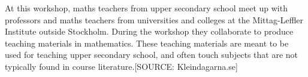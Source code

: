 At this workshop, maths teachers from upper secondary school meet up with professors and maths teachers from universities and colleges at the Mittag-Leffler Institute outside Stockholm. During the workshop they collaborate to produce teaching materials in mathematics. These teaching materials are meant to be used for teaching upper secondary school, and often touch subjects that are not typically found in course literature.[SOURCE: Kleindagarna.se]
